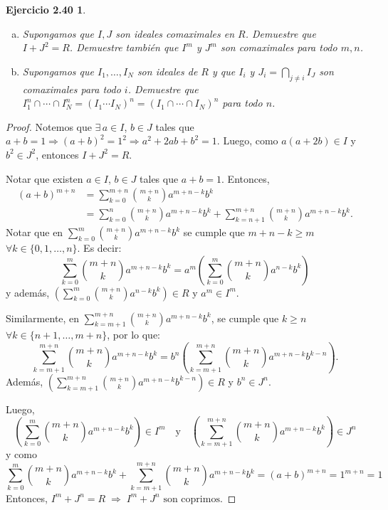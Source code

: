 \documentclass[12pt,a4paper]{article}
\theoremstyle{plain}
\newtheorem*{ejercicio5}{Ejercicio 2.40}
\begin{document}

\begin{ejercicio5}
	\begin{enumerate}[(a)]
		\item Supongamos que $I,J$ son ideales comaximales en $R$. Demuestre que $I + J^{2} = R$. Demuestre también que $I^{m}$ y $J^{m}$ son comaximales para todo $m,n$.

		\item Supongamos que $I_{1},\dots,I_{N}$ son ideales de $R$ y que $I_{i}$ y $J_{i} = \bigcap_{j \neq i} I_{J}$ son comaximales para todo $i$. Demuestre que $I_{1}^{n} \cap \cdots \cap I_{N}^{n} = (I_{1} \cdots I_{N})^{n} = (I_{1} \cap \cdots \cap I_{N})^{n}$ para todo $n$.
	\end{enumerate}
\end{ejercicio5}

\begin{proof}
	 Notemos que $\exists\,a\in I$, $b\in J$ tales que $a+b=1\Rightarrow(a+b)^2=1^2\Rightarrow a^2+2ab+b^2=1$. Luego, como $a(a+2b)\in I$ y $b^2\in J^2$, entonces $I+J^2=R$.

	\medskip
	 Notar que existen $a\in I$, $b\in J$ tales que $a+b=1$. Entonces,
	\begin{align*}
	(a+b)^{m+n} &= \sum_{k=0}^{m+n}\binom{m+n}{k}a^{m+n-k}b^k\\
	&= \sum_{k=0}^{n}\binom{m+n}{k}a^{m+n-k}b^k + \sum_{k=n+1}^{m+n}\binom{m+n}{k}a^{m+n-k}b^k.
	\end{align*}
	Notar que en $\sum_{k=0}^{m}\binom{m+n}{k}a^{m+n-k}b^k$ se cumple que $m+n-k\geq m$ $\forall k\in\{0,1,\ldots,n\}$. Es decir:
	\[
	  \sum_{k=0}^{m}\binom{m+n}{k}a^{m+n-k}b^k = a^m\left(\sum_{k=0}^{m}\binom{m+n}{k}a^{n-k}b^k\right)
	\]
	y además, $\left(\sum_{k=0}^{m}\binom{m+n}{k}a^{n-k}b^k\right)\in R$ y $a^m\in I^m$.

	Similarmente, en $\sum_{k=m+1}^{m+n}\binom{m+n}{k}a^{m+n-k}b^k$, se cumple que $k\geq n$ $\forall k\in\{n+1,\ldots,m+n\}$, por lo que:
	\[
	  \sum_{k=m+1}^{m+n}\binom{m+n}{k}a^{m+n-k}b^k = b^n\left(\sum_{k=m+1}^{m+n}\binom{m+n}{k}a^{m+n-k}b^{k-n}\right).
	\]
	Además, $\left(\sum_{k=m+1}^{m+n}\binom{m+n}{k}a^{m+n-k}b^{k-n}\right)\in R$ y $b^n\in J^n$.

	Luego,
	\[
	  \left(\sum_{k=0}^{m}\binom{m+n}{k}a^{m+n-k}b^k\right)\in I^m\quad\text{y}\quad\left(\sum_{k=m+1}^{m+n}\binom{m+n}{k}a^{m+n-k}b^k\right)\in J^n
	\]
	y como
	\[
	  \sum_{k=0}^{m}\binom{m+n}{k}a^{m+n-k}b^k + \sum_{k=m+1}^{m+n}\binom{m+n}{k}a^{m+n-k}b^k = (a+b)^{m+n}=1^{m+n}=1
	\]
	Entonces, $I^m+J^n=R \;\Rightarrow\; I^m+J^n \text{ son coprimos}$.
\end{proof}
\end{document}
